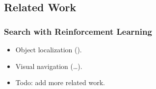 \subsection{Related Work}

\begin{frame}
    \frametitle{Search with Reinforcement Learning}

    \begin{itemize}
        \item Object localization (\cite{caicedo_active_2015,ourselin_artificial_2016,chen_spatial_2017}).
        \item Visual navigation (\dots).
        \item Todo: add more related work.
    \end{itemize}
\end{frame}